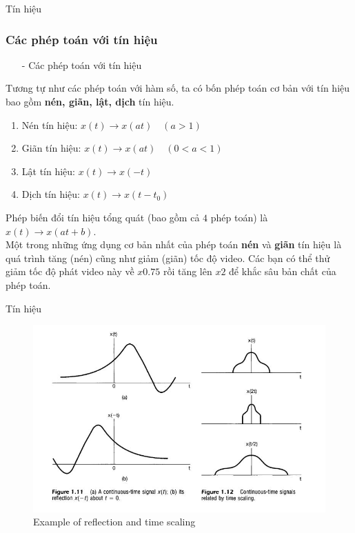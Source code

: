 \documentclass[8pt]{beamer}
\begin{document}
\begin{frame}{Tín hiệu}
\subsubsection{Các phép toán với tín hiệu}
\begin{itemize}
	\item[-] Các phép toán với tín hiệu
\end{itemize}
Tương tự như các phép toán với hàm số, ta có bốn phép toán cơ bản với tín hiệu bao gồm \textbf{nén, giãn, lật, dịch} tín hiệu.
\begin{enumerate}
	\item Nén tín hiệu: $x(t)\to x(at) \quad (a>1)$
	\item Giãn tín hiệu:   $x(t)\to x(at) \quad (0<a<1)$
	\item Lật tín hiệu: $x(t)\to x(-t)$
	\item Dịch tín hiệu: $x(t)\to x(t-t_{0})$
\end{enumerate}
Phép biến đổi tín hiệu tổng quát (bao gồm cả $4$ phép toán) là $x(t)\to x(at+b)$.
\\ Một trong những ứng dụng cơ bản nhất của phép toán \textbf{nén} và \textbf{giãn} tín hiệu là quá trình tăng (nén) cũng như giảm (giãn) tốc độ video. Các bạn có thể thử giảm tốc độ phát video này về $x0.75$ rồi tăng lên $x2$ để khắc sâu bản chất của phép toán.  
\end{frame}
\begin{frame}{Tín hiệu}

\begin{figure}[h]
			\includegraphics[width=1\textwidth]{compress.jpg}
			\caption{Example of reflection and time scaling}			\label{fig:re7}
		\end{figure}
\end{frame}
\end{document}
